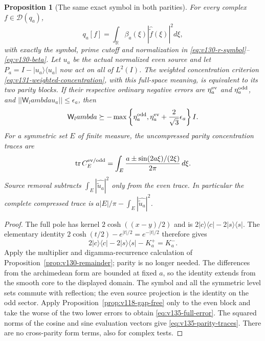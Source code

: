 \documentclass[11pt]{article}
\def\lambda{lambda}%
\def\norm#1{||#1||}%
\newtheorem{proposition}[theorem]{Proposition}
\theoremstyle{remark}
\newcommand{\norm}[1]{\left\lVert #1\right\rVert}
\begin{document}
\begin{proposition}[The same exact symbol in both parities]
\label{prop:v135-both-parities}
For every complex $f\in\mathcal D(q_a)$,
\begin{equation}\label{eq:v135-full-symbol}
 q_a[f]=\int_{\mathbb R}\beta_a(\xi)
                    |\widehat{\widetilde f}(\xi)|^2d\xi,
\end{equation}
with exactly the symbol, prime cutoff and normalization in
\eqref{eq:v130-r-symbol}--\eqref{eq:v130-beta}.
Let $u_a$ be the actual normalized even source and let
$P_a=I-|u_a\rangle\langle u_a|$ now act on all of $L^2(I)$.
The weighted concentration criterion
\eqref{eq:v131-weighted-concentration}, with this full-space meaning,
is equivalent to its two parity blocks.  If their respective ordinary
negative errors are $\eta_a^{\rm ev}$ and $\eta_a^{\rm odd}$, and
$\norm{\mathsf W_\lambda u_a}\le\epsilon_a$, then
\begin{equation}\label{eq:v135-full-error}
 \mathsf W_\lambda\succeq-
 \max\left\{\eta_a^{\rm odd},
      \eta_a^{\rm ev}+\frac2{\sqrt3}\epsilon_a\right\}I.
\end{equation}
For a symmetric set $E$ of finite measure, the uncompressed parity
concentration traces are
\begin{equation}\label{eq:v135-parity-traces}
 \operatorname{tr}C_E^{\rm ev/odd}
 =\int_E\frac{a\mathbin{\pm}\sin(2a\xi)/(2\xi)}{2\pi}\,d\xi.
\end{equation}
Source removal subtracts $\int_E|\widehat{\widetilde u_a}|^2$ only
from the even trace.  In particular the complete compressed trace is
$a|E|/\pi-\int_E|\widehat{\widetilde u_a}|^2$.
\end{proposition}
\begin{proof}
The full pole has kernel $2\cosh((x-y)/2)$ and is
$2|c\rangle\langle c|-2|s\rangle\langle s|$.  The elementary
identity $2\cosh(t/2)-e^{|t|/2}=e^{-|t|/2}$ therefore gives
\[
 2|c\rangle\langle c|-2|s\rangle\langle s|-K_a^+=K_a^-.
\]
Apply the multiplier and digamma-recurrence calculation of
Proposition~\ref{prop:v130-remainder}; parity is no longer needed.
The differences from the archimedean form are bounded at fixed $a$,
so the identity extends from the smooth core to the displayed domain.
The symbol and all the symmetric level sets commute with reflection;
the even source projection is the identity on the odd sector.
Apply Proposition~\ref{prop:v118-gap-free} only to the even block and
take the worse of the two lower errors to obtain
\eqref{eq:v135-full-error}.  The squared norms of the cosine and sine
evaluation vectors give \eqref{eq:v135-parity-traces}.  There are no
cross-parity form terms, also for complex tests.
\end{proof}
\end{document}
